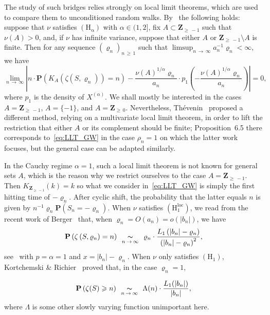 \documentclass[AHL,Unicode,longabstracts,published]{cedram}
\newcommand{\ensembles}[1]{\mathbf{#1}}
\newcommand{\Z}{\ensembles{Z}}
\renewcommand{\P}{\ensembles{P}}
\renewcommand{\Pr}[1]{\P\left(#1\right)}
\newcommand{\1}{\ensembles{1}}
\renewcommand{\ge}{\geqslant}
\newcommand{\Xmap}{X}
\newcommand{\Hrm}{\mathrm{H}}
\newcommand{\Hrmloc}{\mathrm{(H_1^{loc})}}
\newcommand{\Hrmalp}{\mathrm{(H_\alpha)}}
\newcommand{\equivalent}[1][n]{\enskip\mathop{\thicksim}^{}_{#1\,\to\,\infty}\enskip}
\begin{document}
The study of such bridges relies strongly on local limit theorems, which are used to compare them to unconditioned random walks. By~\cite[Equation~50]{Kor12} the following holds: suppose that $\nu$ satisfies $\Hrmalp$ with $\alpha \in (1, 2]$, fix $A \subset \Z_{\ge\,-1}$ such that $\nu(A) > 0$, and, if $\nu$ has infinite variance, suppose that either $A$ or $\Z_{\ge\,-1} \setminus A$ is finite. Then for any sequence $(\varrho_n)_{n\,\ge\,1}$ such that $\limsup_{n\,\to\, \infty} a_n^{-1} \varrho_n < \infty$, we have
\begin{equation}\label{eq:LLT_GW}
\lim_{n\,\to\,\infty} \left|n \cdot \Pr{K_A\left(\zeta\left(S, \varrho_n\right)\right) = n} - \frac{\nu(A)^{1/\alpha} \varrho_n}{a_n} \cdot p_1\left(- \frac{\nu(A)^{1/\alpha} \varrho_n}{a_n}\right)\right| = 0,
\end{equation}
where $p_1$ is the density of $\Xmap^{(\alpha)}$. We shall mostly be interested in the cases $A = \Z_{\ge\,-1}$, $A = \{-1\}$, and $A = \Z_{\ge\,0}$. Nevertheless, Thévenin~\cite{The20} proposed a different method, relying on a multivariate local limit theorem, in order to lift the restriction that either $A$ or its complement should be finite; Proposition~6.5 there corresponds to~\eqref{eq:LLT_GW} in the case $\rho_n=1$ on which the latter work focuses, but the general case can be adapted similarly.

In the Cauchy regime $\alpha = 1$, such a local limit theorem is not known for general sets $A$, which is the reason why we restrict ourselves to the case $A = \Z_{\ge\,-1}$. Then $K_{\Z_{\ge\,-1}}(k) = k$ so what we consider in~\eqref{eq:LLT_GW} is simply the first hitting time of $-\varrho_n$. After cyclic shift, the probability that the latter equals $n$ is given by $n^{-1} \varrho_n \P(S_n = - \varrho_n)$. When $\nu$ satisfies $\Hrmloc$, we read from the recent work of Berger~\cite[Theorem~2.4]{Ber19} that, when $\varrho_n = O(a_n) = o(|b_n|)$, we have
\begin{equation}\label{eq:LLT_GW_Cauchy_loc}
\Pr{\zeta\left(S, \varrho_n\right) = n}
\equivalent
\varrho_n \cdot \frac{L_1\left(|b_n| - \varrho_n\right)}{\left(|b_n| - \varrho_n\right)^2},
\end{equation}
see~\cite[Equation~2.10]{Ber19} with $p = \alpha = 1$ and $x = |b_n| - \varrho_n$. When $\nu$ only satisfies $(\Hrm_1)$, Kortchemski \& Richier~\cite[Proposition~12]{KR19} proved that, in the case $\varrho_n = 1$,

\begin{equation}\label{eq:LLT_GW_Cauchy_gen}
\Pr{\zeta(S) \ge n}
\equivalent
\Lambda(n) \cdot \frac{L_1(|b_n|)}{|b_n|},
\end{equation}
where $\Lambda$ is some other slowly varying function unimportant here.
\end{document}
